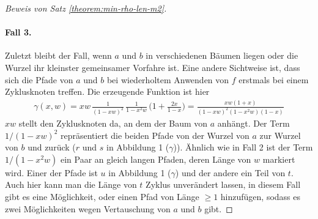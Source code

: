 \documentclass[a4paper, 10pt, ngerman]{article}
\begin{document}
\begin{proof}[Beweis von Satz \ref{theorem:min-rho-len-m2}]
    \paragraph{Fall 3.} Zuletzt bleibt der Fall, wenn $a$ und $b$ in verschiedenen Bäumen liegen oder die Wurzel ihr kleinster gemeinsamer Vorfahre ist. Eine andere Sichtweise ist, dass sich die Pfade von $a$ und $b$ bei wiederholtem Anwenden von $f$ erstmals bei einem Zyklusknoten treffen. Die erzeugende Funktion ist hier
    \begin{align*}
        \gamma(x, w)
        = xw \, \frac {1} {(1 - xw)^2} \, \frac {1} {1 - x^2w} \,
        \Bigg (1 + \frac {2x}{1 - x} \Bigg )
        = \frac {xw(1 + x)} {(1 - xw)^2(1 - x^2w)(1 - x)}
    \end{align*}
    $xw$ stellt den Zyklusknoten da, an dem der Baum von $a$ anhängt. Der Term $1/(1 - xw)^2$ repräsentiert die beiden Pfade von der Wurzel von $a$ zur Wurzel von $b$ und zurück ($r$ und $s$ in Abbildung 1 ($\gamma$)). Ähnlich wie in Fall 2 ist der Term $1/(1 - x^2w)$ ein Paar an gleich langen Pfaden, deren Länge von $w$ markiert wird. Einer der Pfade ist $u$ in Abbildung 1 ($\gamma$) und der andere ein Teil von $t$. Auch hier kann man die Länge von $t$ Zyklus unverändert lassen, in diesem Fall gibt es eine Möglichkeit, oder einen Pfad von Länge $\ge 1$ hinzufügen, sodass es zwei Möglichkeiten wegen Vertauschung von $a$ und $b$ gibt.


\end{proof}
\end{document}
